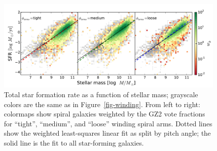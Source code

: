 \documentclass{emulateapj}
\begin{document}



\appendix
\begin{figure}
\includegraphics[angle=0,width=7.0in]{figures/ms_arms_winding_weighted.pdf}
\caption{Total star formation rate as a function of stellar mass; grayscale colors are the same as in Figure~\ref{fig-winding}. From left to right: colormaps show spiral galaxies weighted by the GZ2 vote fractions for ``tight'', ``medium'', and ``loose'' winding spiral arms. Dotted lines show the weighted least-squares linear fit as split by pitch angle; the solid line is the fit to all star-forming galaxies. 
\label{fig-winding_weighted}}
\end{figure}
\end{document}

